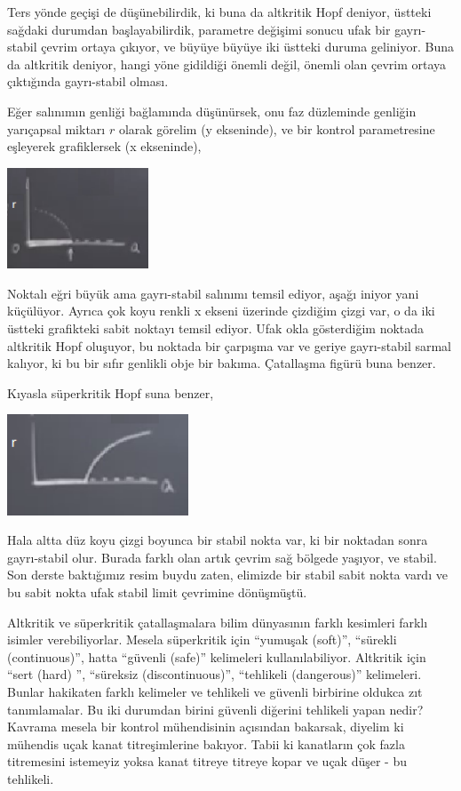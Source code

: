 \documentclass[12pt,fleqn]{article}\usepackage{../../common}
\begin{document}
Ters yönde geçişi de düşünebilirdik, ki buna da altkritik Hopf deniyor, üstteki
sağdaki durumdan başlayabilirdik, parametre değişimi sonucu ufak bir
gayrı-stabil çevrim ortaya çıkıyor, ve büyüye büyüye iki üstteki duruma
geliniyor. Buna da altkritik deniyor, hangi yöne gidildiği önemli değil, önemli
olan çevrim ortaya çıktığında gayrı-stabil olması. 

Eğer salınımın genliği bağlamında düşünürsek, onu faz düzleminde genliğin
yarıçapsal miktarı $r$ olarak görelim (y ekseninde), ve bir kontrol
parametresine eşleyerek grafiklersek (x ekseninde),

\includegraphics[height=3cm]{13_04.png}

Noktalı eğri büyük ama gayrı-stabil salınımı temsil ediyor, aşağı iniyor yani
küçülüyor. Ayrıca çok koyu renkli x ekseni üzerinde çizdiğim çizgi var, o da
iki üstteki grafikteki sabit noktayı temsil ediyor. Ufak okla gösterdiğim
noktada altkritik Hopf oluşuyor, bu noktada bir çarpışma var ve geriye
gayrı-stabil sarmal kalıyor, ki bu bir sıfır genlikli obje bir
bakıma. Çatallaşma figürü buna benzer.

Kıyasla süperkritik Hopf suna benzer,

\includegraphics[height=3cm]{13_05.png}

Hala altta düz koyu çizgi boyunca bir stabil nokta var, ki bir noktadan sonra
gayrı-stabil olur. Burada farklı olan artık çevrim sağ bölgede yaşıyor, ve
stabil. Son derste baktığımız resim buydu zaten, elimizde bir stabil sabit nokta
vardı ve bu sabit nokta ufak stabil limit çevrimine dönüşmüştü.

Altkritik ve süperkritik çatallaşmalara bilim dünyasının farklı kesimleri
farklı isimler verebiliyorlar. Mesela süperkritik için ``yumuşak (soft)'',
``sürekli (continuous)'', hatta ``güvenli (safe)'' kelimeleri
kullanılabiliyor. Altkritik için ``sert (hard) '', ``süreksiz
(discontinuous)'', ``tehlikeli (dangerous)'' kelimeleri. Bunlar hakikaten
farklı kelimeler ve tehlikeli ve güvenli birbirine oldukca zıt
tanımlamalar. Bu iki durumdan birini güvenli diğerini tehlikeli yapan
nedir? Kavrama mesela bir kontrol mühendisinin açısından bakarsak, diyelim
ki mühendis uçak kanat titreşimlerine bakıyor. Tabii ki kanatların çok
fazla titremesini istemeyiz yoksa kanat titreye titreye kopar ve uçak düşer
- bu tehlikeli.
\end{document}
